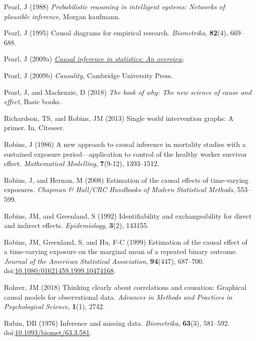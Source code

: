 \documentclass[
  singlecolumn]{article}
\newlength{\cslhangindent}
\newenvironment{CSLReferences}[2] %
 {\begin{list}{}{%
  \setlength{\itemindent}{0pt}
  \setlength{\leftmargin}{0pt}
  \setlength{\parsep}{0pt}
  \ifodd #1
   \setlength{\leftmargin}{\cslhangindent}
   \setlength{\itemindent}{-1\cslhangindent}
  \fi
  \setlength{\itemsep}{#2\baselineskip}}}
 {\end{list}}
\begin{document}
\begin{CSLReferences}{1}{0}
Pearl, J (1988) \emph{Probabilistic reasoning in intelligent systems:
Networks of plausible inference}, Morgan kaufmann.

Pearl, J (1995) Causal diagrams for empirical research.
\emph{Biometrika}, \textbf{82}(4), 669--688.

Pearl, J (2009a) \emph{\href{https://doi.org/10.1214/09-SS057}{Causal
inference in statistics: An overview}}.

Pearl, J (2009b) \emph{Causality}, Cambridge University Press.

Pearl, J, and Mackenzie, D (2018) \emph{The book of why: The new science
of cause and effect}, Basic books.

Richardson, TS, and Robins, JM (2013) Single world intervention graphs:
A primer. In, Citeseer.

Robins, J (1986) A new approach to causal inference in mortality studies
with a sustained exposure period---application to control of the healthy
worker survivor effect. \emph{Mathematical Modelling}, \textbf{7}(9-12),
1393--1512.

Robins, J, and Hernan, M (2008) Estimation of the causal effects of
time-varying exposures. \emph{Chapman \& Hall/CRC Handbooks of Modern
Statistical Methods}, 553--599.

Robins, JM, and Greenland, S (1992) Identifiability and exchangeability
for direct and indirect effects. \emph{Epidemiology}, \textbf{3}(2),
143155.

Robins, JM, Greenland, S, and Hu, F-C (1999) Estimation of the causal
effect of a time-varying exposure on the marginal mean of a repeated
binary outcome. \emph{Journal of the American Statistical Association},
\textbf{94}(447), 687--700.
doi:\href{https://doi.org/10.1080/01621459.1999.10474168}{10.1080/01621459.1999.10474168}.

Rohrer, JM (2018) Thinking clearly about correlations and causation:
Graphical causal models for observational data. \emph{Advances in
Methods and Practices in Psychological Science}, \textbf{1}(1), 2742.

Rubin, DB (1976) Inference and missing data. \emph{Biometrika},
\textbf{63}(3), 581--592.
doi:\href{https://doi.org/10.1093/biomet/63.3.581}{10.1093/biomet/63.3.581}.


\end{CSLReferences}
\end{document}
